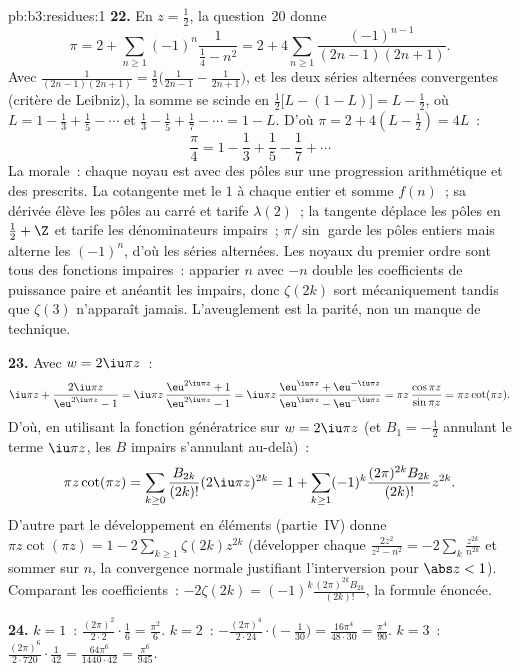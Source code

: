 \begin{solution}{pb:b3:residues:1}
\textbf{22.} En $z = \frac12$, la question~20 donne
\[
\pi = 2 + \sum_{n\geq1}(-1)^n\frac{1}{\frac14 - n^2}
= 2 + 4\sum_{n\geq1}\frac{(-1)^{n-1}}{(2n-1)(2n+1)} .
\]
Avec $\frac1{(2n-1)(2n+1)} = \frac12\bigl(\frac1{2n-1} -
\frac1{2n+1}\bigr)$, et les deux séries alternées
convergentes (critère de Leibniz), la somme se scinde en
$\frac12\bigl[L - (1 - L)\bigr] = L - \frac12$, où $L = 1 -
\frac13 + \frac15 - \cdots$ et $\frac13 - \frac15 +
\frac17 - \cdots = 1 - L$. D'où $\pi = 2 + 4(L - \frac12) =
4L$~:
\[
\frac\pi4 = 1 - \frac13 + \frac15 - \frac17 + \cdots
\]
La morale~: chaque noyau est  avec des pôles sur
une progression arithmétique et des  prescrits. La
cotangente met le  $1$ à chaque entier et somme
$f(n)$~; sa dérivée élève les pôles au carré et tarife
$\lambda(2)$~; la tangente déplace les pôles en $\frac12 +
\Z$ et tarife les dénominateurs impairs~; $\pi/\sin$ garde
les pôles entiers mais alterne les  $(-1)^n$, d'où
les séries alternées. Les noyaux du premier ordre sont tous
des fonctions impaires~: apparier $n$ avec $-n$ double les
coefficients de puissance paire et anéantit les impairs,
donc $\zeta(2k)$ sort mécaniquement tandis que $\zeta(3)$
n'apparaît jamais. L'aveuglement est la parité, non un
manque de technique.

\textbf{23.} Avec $w = 2\iu\pi z$~:
\[
\iu\pi z + \frac{2\iu\pi z}{\eu^{2\iu\pi z} - 1}
= \iu\pi z\,\frac{\eu^{2\iu\pi z} + 1}{\eu^{2\iu\pi z} - 1}
= \iu\pi z\,\frac{\eu^{\iu\pi z} +
\eu^{-\iu\pi z}}{\eu^{\iu\pi z} - \eu^{-\iu\pi z}}
= \pi z\,\frac{\cos\pi z}{\sin\pi z} = \pi z\cot(\pi z) .
\]
D'où, en utilisant la fonction génératrice sur $w =
2\iu\pi z$ (et $B_1 = -\frac12$ annulant le terme $\iu\pi
z$, les $B$ impairs s'annulant au-delà)~:
\[
\pi z\cot(\pi z) = \sum_{k\geq0}\frac{B_{2k}}{(2k)!}
(2\iu\pi z)^{2k}
= 1 + \sum_{k\geq1}(-1)^k\frac{(2\pi)^{2k}B_{2k}}{(2k)!}
z^{2k} .
\]
D'autre part le développement en éléments 
(partie~IV) donne $\pi z\cot(\pi z) = 1 -
2\sum_{k\geq1}\zeta(2k)z^{2k}$ (développer chaque
$\frac{2z^2}{z^2 - n^2} = -2\sum_k\frac{z^{2k}}{n^{2k}}$ et
sommer sur $n$, la convergence normale justifiant
l'interversion pour $\abs z < 1$). Comparant les
coefficients~: $-2\zeta(2k) =
(-1)^k\frac{(2\pi)^{2k}B_{2k}}{(2k)!}$, la formule
énoncée.

\textbf{24.} $k = 1$~: $\frac{(2\pi)^2}{2\cdot2}\cdot
\frac16 = \frac{\pi^2}6$. $k = 2$~:
$-\frac{(2\pi)^4}{2\cdot24}\cdot\bigl(-\frac1{30}\bigr) =
\frac{16\pi^4}{48\cdot30} = \frac{\pi^4}{90}$. $k = 3$~:
$\frac{(2\pi)^6}{2\cdot720}\cdot\frac1{42} =
\frac{64\pi^6}{1440\cdot42} = \frac{\pi^6}{945}$.


\end{solution}

